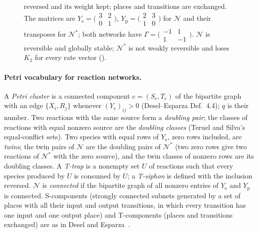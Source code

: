 \documentclass[11pt,a4paper]{report}
\newcommand{\Net}{\mathcal{N}}
\newcommand{\Nd}{\mathcal{N}^{*}}
\newcommand{\Ye}{Y_{\mathrm e}}
\newcommand{\Yp}{Y_{\mathrm p}}
\begin{document}
\begin{figure}[ht]
{reversed and its weight kept; places and transitions are exchanged. The matrices are \(\Ye=\bigl(\begin{smallmatrix}3&2\\0&1\end{smallmatrix}\bigr)\),
\(\Yp=\bigl(\begin{smallmatrix}2&3\\1&0\end{smallmatrix}\bigr)\) for \(\Net\) and their transposes for \(\Nd\); both
networks have \(\Gamma=\bigl(\begin{smallmatrix}-1&1\\1&-1\end{smallmatrix}\bigr)\). \(\Net\) is reversible and
globally stable; \(\Nd\) is not weakly reversible and loses \(K_2\) for every rate vector ().}\label{fig:revdual}
\end{figure}

\paragraph{Petri vocabulary for reaction networks.} A \emph{Petri cluster} is a connected component \(c=(S_c,T_c)\)
of the bipartite graph with an edge \(\{X_i,R_j\}\) whenever \((\Ye)_{ij}>0\) (Desel--Esparza Def.~4.4); \(q\) is
their number. Two reactions with the same source form a \emph{doubling pair}; the classes of reactions with equal
nonzero source are the \emph{doubling classes} (Teruel and Silva's equal-conflict sets). Two species with equal rows
of \(\Ye\), zero rows included, are \emph{twins}; the twin pairs of \(\Net\) are the doubling pairs of \(\Nd\) (two zero rows give two reactions of \(\Nd\) with the
zero source), and the twin classes of nonzero rows are its doubling classes.
A \emph{T-trap} is a nonempty set \(U\) of reactions such that every species produced by \(U\) is consumed by
\(U\); a \emph{T-siphon} is defined with the inclusion reversed. \(\Net\) is \emph{connected} if the bipartite graph
of all nonzero entries of \(\Ye\) and \(\Yp\) is connected. S-components (strongly connected subnets generated by a
set of places with all their input and output transitions, in which every transition has one input and one output
place) and T-components (places and transitions exchanged) are as in Desel and
Esparza~\autocite[Defs~5.1, 5.11]{DeselEsparza1995}.
\end{document}
